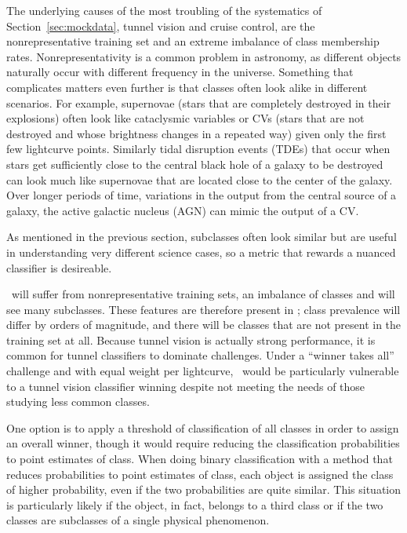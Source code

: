 The underlying causes of the most troubling of the systematics of Section~\ref{sec:mockdata}, tunnel vision and cruise control, are the nonrepresentative training set and an extreme imbalance of class membership rates.
Nonrepresentativity is a common problem in astronomy, as different objects naturally occur with different frequency in the universe. Something that complicates matters even further is that classes often look alike in different scenarios. For example, supernovae (stars that are completely destroyed in their explosions) often look like cataclysmic variables or CVs (stars that are not destroyed and whose brightness changes in a repeated way) given only the first few lightcurve points. Similarly tidal disruption events (TDEs) that occur when stars get sufficiently close to the central black hole of a galaxy to be destroyed can look much like supernovae that are located close to the center of the galaxy. Over longer periods of time, variations in the output from the central source of a galaxy, the active galactic nucleus (AGN) can mimic the output of a CV. 

As mentioned in the previous section, subclasses often look similar but are useful in understanding very different science cases, so a metric that rewards a nuanced classifier is desireable.

\lsst\ will suffer from nonrepresentative training sets, an imbalance of classes and will see many subclasses. These features are therefore present in \plasticc; class prevalence will differ by orders of magnitude, and there will be classes that are not present in the training set at all.
Because tunnel vision is actually strong performance, it is common for tunnel classifiers to dominate challenges.
Under a ``winner takes all'' challenge and with equal weight per lightcurve, \plasticc\ would be particularly vulnerable to a tunnel vision classifier winning despite not meeting the needs of those studying less common classes.

One option is to apply a threshold of classification of all classes in order to assign an overall winner, though it would require reducing the classification probabilities to point estimates of class. When doing binary classification with a method that reduces probabilities to point estimates of class, each object is assigned the class of higher probability, even if the two probabilities are quite similar. This situation is particularly likely if the object, in fact, belongs to a third class or if the two classes are subclasses of a single physical phenomenon.

